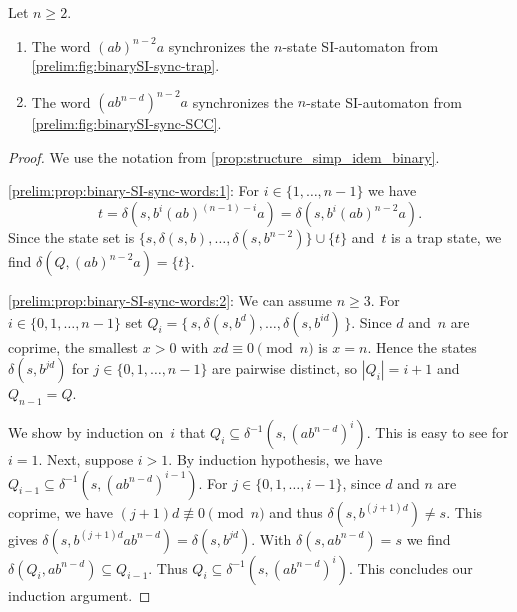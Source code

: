 \begin{proposition}	Let $n \ge 2$.
	\label{prelim:prop:binary-SI-sync-words}
	\begin{enumerate}
		\item \label{prelim:prop:binary-SI-sync-words:1} The word $(ab)^{n-2}a$ synchronizes the $n$-state SI-automaton 
		from \cref{prelim:fig:binarySI-sync-trap}.
		
		\item \label{prelim:prop:binary-SI-sync-words:2} The word $(ab^{n-d})^{n-2}a$ synchronizes the $n$-state SI-automaton 
		from \cref{prelim:fig:binarySI-sync-SCC}.
	\end{enumerate}
\end{proposition} 
\begin{proof} We use the notation from \cref{prop:structure_simp_idem_binary}.
	
\ref{prelim:prop:binary-SI-sync-words:1}: 
For $i \in \{1,\ldots,n-1\}$ we have
\[
t = \delta(s, b^i (ab)^{(n - 1) - i}a) = \delta(s, b^i (ab)^{n-2}a).
\]
Since the state set is $\{ s, \delta(s, b), \ldots, \delta(s, b^{n-2})\} \cup \{t\}$ 
and~$t$ is a trap state, we find $\delta(Q, (ab)^{n-2}a) = \{t\}$.

\ref{prelim:prop:binary-SI-sync-words:2}: We can assume $n \ge 3$.
For $i \in \{0,1,\ldots,n-1\}$ set
$Q_i = \{\, s, \delta(s,b^{d}), \ldots, \delta(s,b^{id}) \,\}$.
Since $d$ and~$n$ are coprime, the smallest $x > 0$ with $xd \equiv 0 \pmod{n}$
is $x = n$. Hence the states $\delta(s,b^{jd})$ for $j \in \{0,1,\ldots,n-1\}$
are pairwise distinct, so $|Q_i| = i+1$ and $Q_{n-1} = Q$.

We show by induction on~$i$ that $Q_i \subseteq \delta^{-1}(s, (ab^{n-d})^{i})$.
This is easy to see for $i = 1$. Next, suppose $i > 1$.
By induction hypothesis, we have $Q_{i-1} \subseteq \delta^{-1}(s, (ab^{n-d})^{i-1})$.
For $j \in \{0,1,\ldots,i-1\}$, since $d$ and $n$ are coprime, we have $(j+1)d \not\equiv 0 \pmod{n}$
and thus $\delta(s, b^{(j+1)d}) \ne s$.
This gives
$
\delta(s, b^{(j+1)d} a b^{n-d}) = \delta(s, b^{jd}).
$
With $\delta(s, ab^{n-d}) = s$ 
we find $\delta(Q_i, ab^{n-d}) \subseteq Q_{i-1}$.
Thus $Q_i \subseteq \delta^{-1}(s, (ab^{n-d})^{i})$. This concludes our induction argument.


\end{proof}
